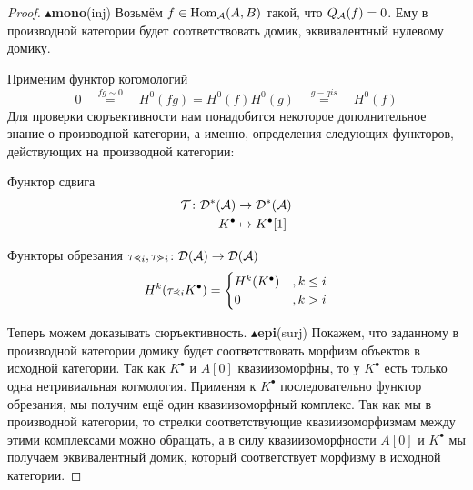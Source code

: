 \documentclass[../main.tex]{subfiles}
\begin{document}
\begin{proof}
$\blacktriangle$\textbf{mono}(inj)
Возьмём $f \in \operatorname{Hom}_{\mathcal{A}}(A, B)$ такой, что $Q_{\mathcal{A}}(f) = 0$. Ему в производной категории будет соответствовать домик, эквивалентный нулевому домику. 
\bee
{} 
\qquad
{} 
\eee
Применим функтор когомологий 
\[
0\quad \overset{fg\sim0}{=}\quad H^0 (fg) = H^0(f) H^0(g)\quad \overset{g-qis}{=}\quad H^0(f) 
\]
Для проверки сюръективности нам понадобится некоторое дополнительное знание о производной категории, а именно, определения следующих функторов, действующих на производной категории:
\begin{to_def}
Функтор сдвига
\begin{align*}
\mathcal{T}\colon \mathcal{D^{*}(A)}& \to \mathcal{D^{*}(A)}\\
 K^\bullet& \mapsto K^\bullet[1]
\end{align*}
\end{to_def}
\begin{to_def}
Функторы обрезания $\tau_{ \curlyeqprec i}, \tau_{ \curlyeqsucc i} \colon \mathcal{D(A)} \to \mathcal{D(A)}$
\[
H^k(\tau_{ \curlyeqprec i} K^\bullet) = \begin{cases}H^k(K^\bullet) &, k \le i \\ 0 &, k>i \end{cases}
\]
\bee
{}
\qquad
{}
\eee
\end{to_def}
Теперь можем доказывать сюръективность.
$\blacktriangle$\textbf{epi}(surj) Покажем, что заданному в производной категории домику будет соответствовать морфизм объектов в исходной категории. Так как $K^\bullet$ и $A[0]$ квазиизоморфны, то у $K^\bullet$ есть только одна нетривиальная когмология. Применяя к $K^\bullet$ последовательно функтор обрезания, мы получим ещё один квазиизоморфный комплекс. Так как мы в производной категории, то стрелки соответствующие квазиизоморфизмам между этими комплексами можно обращать, а в силу квазиизоморфности $A[0]$ и $K^\bullet$ мы получаем эквивалентный домик, который соответствует морфизму в исходной категории.

\end{proof}
\end{document}
